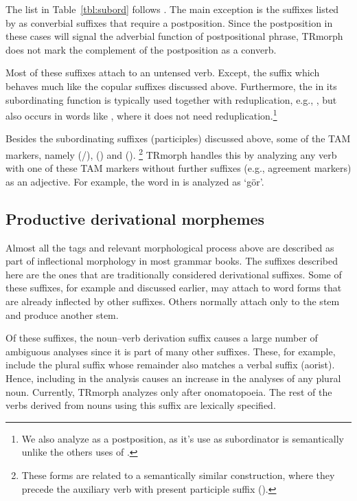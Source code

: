 \documentclass[twocolumn]{article}
\begin{document}
The list in Table~\ref{tbl:subord} follows \cite{goksel2005}. The main
exception is the suffixes listed by \cite{goksel2005} as converbial
suffixes that require a postposition. Since the postposition in these
cases will signal the adverbial function of postpositional phrase,
TRmorph does not mark the complement of the postposition as a converb.

%
%

Most of these suffixes attach to an untensed verb. Except, the suffix
 which behaves much like the copular suffixes discussed
above. Furthermore, the  in its subordinating function
is typically used together with reduplication, e.g., , but also occurs in words like
, where it does not need reduplication.\footnote{We
also analyze  as a postposition, as it's use as
subordinator is semantically unlike the others uses of .}

Besides the subordinating suffixes (participles) discussed above, 
some of the TAM markers, 
namely  (/),  () and  ().%
\footnote{These forms are related to a semantically similar construction, 
where they precede the auxiliary verb  with present participle suffix ().}
TRmorph handles this by analyzing any verb with one of these TAM markers without further suffixes 
(e.g., agreement markers) as an adjective. 
For example, the word 
 in 
is analyzed as
`gör'.

\subsection{Productive derivational morphemes}

Almost all the tags and relevant morphological process above are
described as part of inflectional morphology in most grammar books.
The suffixes described here are the ones that are traditionally
considered derivational suffixes. Some of these suffixes, for example
 and  discussed earlier, may attach to word forms
that are already inflected by other suffixes. Others normally attach
only to the stem and produce another stem.

Of these suffixes, the noun--verb derivation suffix  causes a
large number of ambiguous analyses since it is part of many other
suffixes. These, for example, include the plural suffix 
whose remainder  also matches a verbal suffix (aorist).
Hence, including  in the analysis causes an increase in the
analyses of any plural noun. Currently, TRmorph analyzes 
only after onomatopoeia. The rest of the verbs derived from nouns
using this suffix are lexically specified.
\end{document}
